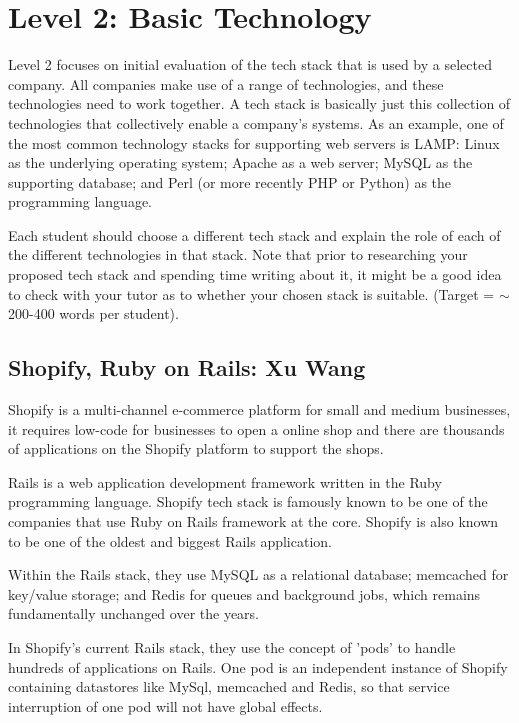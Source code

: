 \documentclass[a4paper, 11pt]{report}
\begin{document}

\newpage
\section{Level 2: Basic Technology}

Level 2 focuses on initial evaluation of the tech stack that is used by a selected company. All companies make use of a range of technologies, and these technologies need to work together. A tech stack is basically just this collection of technologies that collectively enable a company's systems. As an example, one of the most common technology stacks for supporting web servers is LAMP: Linux as the underlying operating system; Apache as a web server; MySQL as the supporting database; and Perl (or more recently PHP or Python) as the programming language.

Each student should choose a different tech stack and explain the role of each of the different technologies in that stack. Note that prior to researching your proposed tech stack and spending time writing about it, it might be a good idea to check with your tutor as to whether your chosen stack is suitable. (Target = $\sim$200-400 words per student).

\subsection{Shopify, Ruby on Rails: Xu Wang}
\indent Shopify is a multi-channel e-commerce platform for small and medium businesses, it requires low-code for businesses to open a online shop and there are thousands of applications on the Shopify platform to support the shops.

Rails is a web application development framework written in the Ruby programming language. Shopify tech stack is famously known to be one of the companies that use Ruby on Rails framework at the core. Shopify is also known to be one of the oldest and biggest Rails application. 

Within the Rails stack, they use MySQL as a relational database; memcached for key/value storage; and Redis for queues and background jobs, which remains fundamentally unchanged over the years.

In Shopify's current Rails stack, they use the concept of 'pods' to handle hundreds of applications on Rails. One pod is an independent instance of Shopify containing datastores like MySql, memcached and Redis, so that service interruption of one pod will not have global effects.
\end{document}
